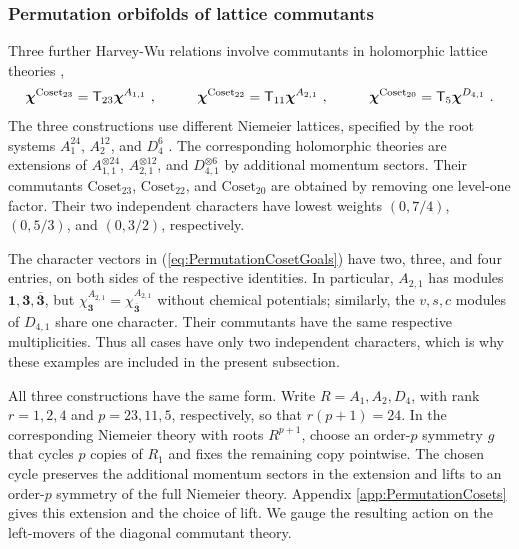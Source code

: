 \documentclass[12pt]{article}
\numberwithin{equation}{section}
\newcommand{\bea}{\begin{eqnarray}}
\newcommand{\eea}{\end{eqnarray}}
\theoremstyle{remark}
\begin{document}
\subsubsection{Permutation orbifolds of lattice commutants}
\label{sec:PermutationCosets}

Three further Harvey-Wu relations involve commutants in holomorphic lattice theories \cite{Gaberdiel:2016zke,Harvey:2018rdc},
\bea \label{eq:PermutationCosetGoals}
\boldsymbol\chi^{\mathrm{Coset}_{23}}=\mathsf T_{23}\boldsymbol\chi^{A_{1,1}}~,\hspace{0.4 in}
\boldsymbol\chi^{\mathrm{Coset}_{22}}=\mathsf T_{11}\boldsymbol\chi^{A_{2,1}}~,\hspace{0.4 in}
\boldsymbol\chi^{\mathrm{Coset}_{20}}=\mathsf T_5\boldsymbol\chi^{D_{4,1}}~.
\eea
The three constructions use different Niemeier lattices, specified by the root systems $A_1^{24}$, $A_2^{12}$, and $D_4^6$ \cite{Schellekens:1992db,Conway:1999dov}. The corresponding holomorphic theories are extensions of $A_{1,1}^{\otimes24}$, $A_{2,1}^{\otimes12}$, and $D_{4,1}^{\otimes6}$ by additional momentum sectors. Their commutants $\mathrm{Coset}_{23}$, $\mathrm{Coset}_{22}$, and $\mathrm{Coset}_{20}$ are obtained by removing one level-one factor. Their two independent characters have lowest weights $(0,7/4)$, $(0,5/3)$, and $(0,3/2)$, respectively.

The character vectors in (\ref{eq:PermutationCosetGoals}) have two, three, and four entries, on both sides of the respective identities. In particular, $A_{2,1}$ has modules $\mathbf1,\mathbf3,\overline{\mathbf3}$, but $\chi^{A_{2,1}}_{\mathbf3}=\chi^{A_{2,1}}_{\overline{\mathbf3}}$ without chemical potentials; similarly, the $v,s,c$ modules of $D_{4,1}$ share one character. Their commutants have the same respective multiplicities. Thus all cases have only two independent characters, which is why these examples are included in the present subsection. 

All three constructions have the same form. Write $R=A_1,A_2,D_4$, with rank $r=1,2,4$ and $p=23,11,5$, respectively, so that $r(p+1)=24$. In the corresponding Niemeier theory with roots $R^{p+1}$, choose an order-$p$ symmetry $g$ that cycles $p$ copies of $R_1$ and fixes the remaining copy pointwise. The chosen cycle preserves the additional momentum sectors in the extension and lifts to an order-$p$ symmetry of the full Niemeier theory. Appendix \ref{app:PermutationCosets} gives this extension and the choice of lift. We gauge the resulting action on the left-movers of the diagonal commutant theory.
\end{document}
